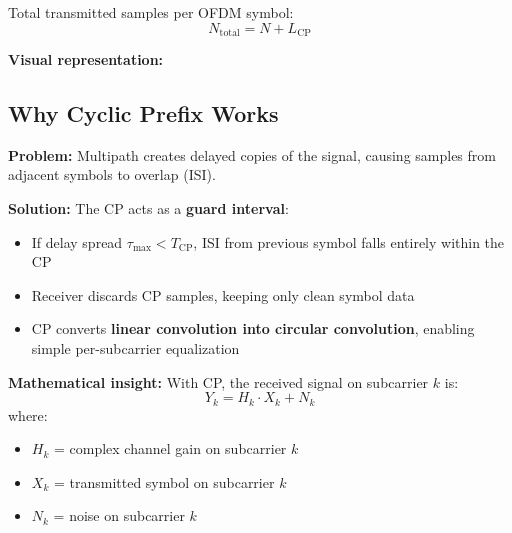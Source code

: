 Total transmitted samples per OFDM symbol:
\begin{equation}
N_{\mathrm{total}} = N + L_{\mathrm{CP}}
\end{equation}

\textbf{Visual representation:}
\begin{center}
\end{center}

\subsection{Why Cyclic Prefix Works}

\textbf{Problem:} Multipath creates delayed copies of the signal, causing samples from adjacent symbols to overlap (ISI).

\textbf{Solution:} The CP acts as a \textbf{guard interval}:
\begin{itemize}
\item If delay spread $\tau_{\mathrm{max}} < T_{\mathrm{CP}}$, ISI from previous symbol falls entirely within the CP
\item Receiver discards CP samples, keeping only clean symbol data
\item CP converts \textbf{linear convolution into circular convolution}, enabling simple per-subcarrier equalization
\end{itemize}

\textbf{Mathematical insight:} With CP, the received signal on subcarrier $k$ is:
\begin{equation}
Y_k = H_k \cdot X_k + N_k
\end{equation}
where:
\begin{itemize}
\item $H_k$ = complex channel gain on subcarrier $k$
\item $X_k$ = transmitted symbol on subcarrier $k$
\item $N_k$ = noise on subcarrier $k$
\end{itemize}

